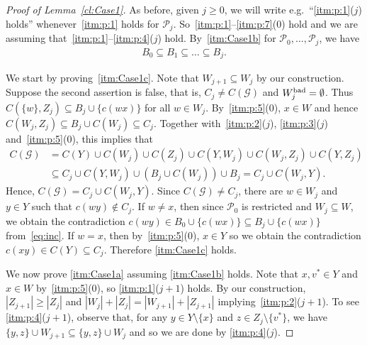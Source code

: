 \documentclass[a4paper, 12pt]{article}
\numberwithin{equation}{section}
\newcommand{\mc}[1]{\mathcal{#1}}
\newcommand{\ms}[1]{\mathscr{#1}}
\begin{document}
\begin{proof}[Proof of Lemma~\ref{cl:Case1}]
As before, given $j \geq 0$, we will write e.g.~``\ref{itm:p:1}($j$) holds'' whenever~\ref{itm:p:1} holds for $\mc{P}_j$.
So~\ref{itm:p:1}--\ref{itm:p:7}($0$) hold and we are assuming that~\ref{itm:p:1}--\ref{itm:p:4}($j$) hold.
By~\ref{itm:Case1b} for $\mc{P}_0,\ldots,\mc{P}_j$, we have 
\begin{align}\label{eq:inc}
B_0 \subseteq B_1 \subseteq \ldots \subseteq B_j.
\end{align} 

We start by proving~\ref{itm:Case1c}.
Note that $W_{j+1} \subseteq W_j$ by our construction.
Suppose the second assertion is false, that is, $C_j \ne C(\ms{G})$ and $W^{\rm bad}_j = \emptyset$.
Thus $C(\{w\},Z_j) \subseteq B_j \cup \{c(wx)\}$ for all $w \in W_j$.
By~\ref{itm:p:5}($0$), $x \in W$ and hence $C(W_j,Z_j) \subseteq B_j \cup C(W_j) \subseteq C_j$.
Together with~\ref{itm:p:2}($j$), \ref{itm:p:3}($j$) and~\ref{itm:p:5}($0$), this implies that
\begin{align*}
    C(\ms{G}) & = C(Y) \cup C(W_j) \cup C(Z_j) \cup C(Y,W_j) \cup C(W_j,Z_j) \cup C(Y,Z_j)\\
    & \subseteq C_j \cup C(Y,W_j)  \cup ( B_j \cup C(W_j)) \cup B_j = C_j \cup C(W_j,Y).
\end{align*}
Hence, $C(\ms{G})= C_j \cup C(W_j,Y)$.
Since $C(\ms{G}) \neq C_j$, there are $w \in W_j$ and $y \in Y$ such that $c(wy) \notin C_j$.
If $w \neq x$, then since $\mathcal{P}_0$ is restricted and $W_j \subseteq W$, we obtain the contradiction $c(wy) \in B_0 \cup \{c(wx)\} \subseteq B_j \cup \{c(wx)\}$ from~\eqref{eq:inc}.
If $w=x$, then by~\ref{itm:p:5}($0$), $x \in Y$ so we obtain the contradiction $c(xy) \in C(Y) \subseteq C_j$.
Therefore \ref{itm:Case1c} holds.

We now prove \ref{itm:Case1a} assuming \ref{itm:Case1b} holds.
Note that $x, v^* \in Y$ and $x \in W$ by~\ref{itm:p:5}($0$), so \ref{itm:p:1}($j+1$) holds. 
By our construction,  $|Z_{j+1}|\ge |Z_j|$ and $|W_j| + |Z_j| = |W_{j+1}|+|Z_{j+1}|$ implying~\ref{itm:p:2}($j+1$).
To see \ref{itm:p:4}($j+1$), observe that, for any $y \in Y \setminus \{x\}$ and $z \in Z_j \setminus \{v^*\}$, we have $\{y,z\} \cup W_{j+1} \subseteq \{y,z\} \cup W_{j}$ and so we are done by \ref{itm:p:4}($j$).


\end{proof}
\end{document}
